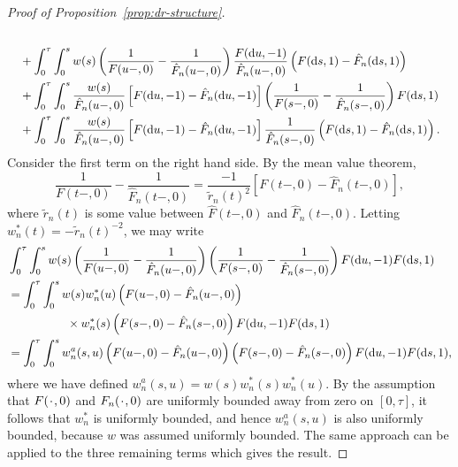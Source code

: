 \begin{proof}[Proof of Proposition~\ref{prop:dr-structure}]
\begin{align*}
      \\
      & \quad +
        \int_0^{\tau}
        \int_0^s
        w(s) 
        \left(
        \frac{1}{F(u-, 0)} -  \frac{1}{\hat{F}_n(u-, 0)}
        \right) \frac{F(\diff u, -1) }{\hat{F}_n(u-,0)}
        \left(
        F(\diff s, 1) -
        \hat{F}_n(\diff s, 1)
        \right)
      \\
      & \quad +
        \int_0^{\tau} 
        \int_0^s      
        \frac{w(s) }{\hat{F}_n(u-, 0)} 
        \left[
        F(\diff u, -1) - \hat{F}_n(\diff u, -1)
        \right]
        \left(
        \frac{1}{F(s-, 0)} -
        \frac{1}{\hat{F}_n(s-, 0)}
        \right)F(\diff s, 1)
      \\
      & \quad +
        \int_0^{\tau} 
        \int_0^s      
        \frac{w(s) }{\hat{F}_n(u-, 0)} 
        \left[
        F(\diff u, -1) - \hat{F}_n(\diff u, -1)
        \right]
        \frac{1}{\hat{F}_n(s-, 0)}
        \left(
        F(\diff s, 1) -
        \hat{F}_n(\diff s, 1)
        \right).
    \end{align*}
    \endgroup %
    Consider the first term on the right hand side. By the mean value theorem,
    \begin{equation*}
      \frac{1}{F(t-, 0)}
      - \frac{1}{\hat{F}_n(t-, 0)}
      = \frac{-1}{\tilde{r}_n(t)^2}
      \left[
        F(t-, 0)
        - \hat{F}_n(t-, 0)
      \right],
    \end{equation*}
    where \( \tilde{r}_n(t) \) is some value between \( \hat{F}(t-, 0) \) and
    \( \hat{F}_n(t-, 0) \). Letting \( w_n^*(t) = -\tilde{r}_n(t)^{-2} \), we
    may write
  \begin{align*}
    & \int_0^{\tau} 
      \int_0^s
      w(s) 
      \left(
      \frac{1}{F(u-, 0)} -  \frac{1}{\hat{F}_n(u-, 0)}
      \right)      
      \left(
      \frac{1}{F(s-, 0)} -
      \frac{1}{\hat{F}_n(s-, 0)}
      \right)F(\mathop{}\!\mathrm{d} u, -1)F(\mathop{}\!\mathrm{d} s, 1)
    \\
    & =
      \int_0^{\tau} 
      \int_0^s
      w(s)
      w_n^*(u) 
      \left(
      F(u-, 0) - \hat{F}_n(u-, 0)
      \right)
    \\
    & \qquad \qquad \quad
      \times
      w_n^*(s) 
      \left(
      F(s-, 0) - \hat{F}_n(s-, 0)
      \right)       
      F(\mathop{}\!\mathrm{d} u, -1)F(\mathop{}\!\mathrm{d} s, 1)
    \\
    & =
      \int_0^{\tau} 
      \int_0^s
      w_n^a(s,u)
      \left(
      F(u-, 0) - \hat{F}_n(u-, 0)
      \right)
      \left(
      F(s-, 0) - \hat{F}_n(s-, 0)
      \right)       
      F(\mathop{}\!\mathrm{d} u, -1)F(\mathop{}\!\mathrm{d} s, 1),
  \end{align*}
  where we have defined \( w_n^a(s,u) = w(s)w^*_n(s)w^*_n(u) \). By the
  assumption that \( F(\blank,0) \) and \( F_n(\blank,0) \) are uniformly
  bounded away from zero on \( [0,\tau] \), it follows that \( w_n^* \) is
  uniformly bounded, and hence \( w_n^a(s,u) \) is also uniformly bounded,
  because \( w \) was assumed uniformly bounded. The same approach can be
  applied to the three remaining terms which gives the result.
\end{proof}




